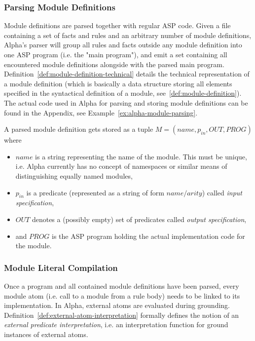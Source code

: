 \subsubsection{Parsing Module Definitions}

Module definitions are parsed together with regular ASP code. Given a file containing a set of facts and rules and an arbitrary number of module definitions, Alpha's parser will group all rules and facts outside any module definition into one ASP program (i.e. the "main program"), and emit a set containing all encountered module definitions alongside with the parsed main program. Definition~\ref{def:module-definition-technical} details the technical representation of a module definition (which is basically a data structure storing all elements specified in the syntactical definition of a module, see~\ref{def:module-definition}). The actual code used in Alpha for parsing and storing module definitions can be found in the Appendix, see Example~\ref{ex:alpha-module-parsing}.

\begin{definition}
\label{def:module-definition-technical}
A parsed module definition gets stored as a tuple $M = (\mathit{name},\mathit{p_{in}},\mathit{OUT},\mathit{PROG})$ where
\begin{itemize}
    \item $\mathit{name}$ is a string representing the name of the module. This must be unique, i.e. Alpha currently has no concept of namespaces or similar means of distinguishing equally named modules,
    \item $\mathit{p_{in}}$ is a predicate (represented as a string of form $\mathit{name}/\mathit{arity}$) called \emph{input specification},
    \item $\mathit{OUT}$ denotes a (possibly empty) set of predicates called \emph{output specification},
    \item and $\mathit{PROG}$ is the ASP program holding the actual implementation code for the module.
\end{itemize}
\end{definition}   

\subsubsection{Module Literal Compilation}

Once a program and all contained module definitions have been parsed, every module atom (i.e. call to a module from a rule body) needs to be linked to its implementation. In Alpha, external atoms are evaluated during grounding. Definition~\ref{def:external-atom-interpretation} formally defines the notion of an \emph{external predicate interpretation}, i.e. an interpretation function for ground instances of external atoms. 

